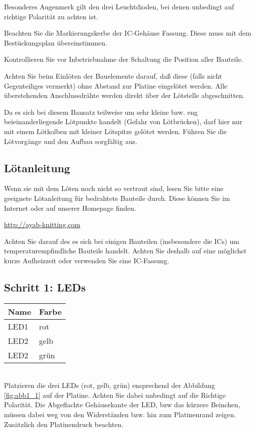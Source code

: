 \documentclass[fleqn,10pt]{SelfArx} %
\begin{document}
Besonderes Augenmerk gilt den drei Leuchtdioden, bei denen unbedingt auf richtige Polarität zu achten ist.

Beachten Sie die Markierungskerbe der IC-Gehäuse Fassung. Diese muss mit dem Bestückungsplan übereinstimmen.

Kontrollieren Sie vor Inbetriebnahme der Schaltung die Position aller Bauteile.

Achten Sie beim Einlöten der Bauelemente darauf, daß diese (falls nicht Gegenteiliges vermerkt) ohne Abstand zur Platine eingelötet werden. Alle überstehenden Anschlussdrähte werden direkt über der Lötstelle abgeschnitten.

Da es sich bei diesem Bausatz teilweise um sehr kleine bzw. eng beieinanderliegende Lötpunkte handelt (Gefahr von Lötbrücken), darf hier nur mit einem Lötkolben mit kleiner Lötspitze gelötet werden. Führen Sie die Lötvorgänge und den Aufbau sorgfältig aus.

 \subsection*{Lötanleitung}

Wenn sie mit dem Löten noch nicht so vertraut sind, lesen Sie bitte eine geeignete Lötanleitung für bedrahtete Bauteile durch. Diese können Sie im Internet oder auf unserer Homepage finden.

\url{http://ayab-knitting.com}

Achten Sie darauf des es sich bei einigen Bauteilen (insbesondere die ICs) um temperaturempfindliche Bauteile handelt. Achten Sie deshalb auf eine möglichst kurze Aufheizzeit oder verwenden Sie eine IC-Fassung.

 \subsection*{Schritt 1: LEDs}


\begin{tabular}{ll}
\hline
\textbf{Name} & \textbf{Farbe} \\ \hline
LED1          & rot            \\ \hline
LED2          & gelb           \\ \hline
LED2          & grün           \\ \hline
\end{tabular}\\

Platzieren die drei LEDs (rot, gelb, grün) ensprechend der Abbildung \ref{fig:abb1_1} auf der Platine. Achten Sie dabei unbedingt auf die Richtige Polarität. Die Abgeflachte Gehäusekante der LED, bzw das kürzere Beinchen, müssen dabei weg von den Widerständen bzw. hin zum Platinenrand zeigen. Zusätzlich den Platinendruck beachten.
\end{document}
